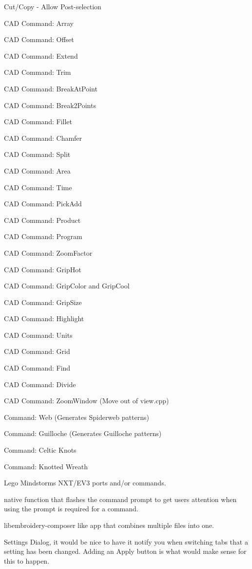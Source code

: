   \item Cut/Copy - Allow Post-selection
  \item CAD Command: Array
  \item CAD Command: Offset
  \item CAD Command: Extend
  \item CAD Command: Trim
  \item CAD Command: BreakAtPoint
  \item CAD Command: Break2Points
  \item CAD Command: Fillet
  \item CAD Command: Chamfer
  \item CAD Command: Split
  \item CAD Command: Area
  \item CAD Command: Time
  \item CAD Command: PickAdd
  \item CAD Command: Product
  \item CAD Command: Program
  \item CAD Command: ZoomFactor
  \item CAD Command: GripHot
  \item CAD Command: GripColor and GripCool
  \item CAD Command: GripSize
  \item CAD Command: Highlight
  \item CAD Command: Units
  \item CAD Command: Grid
  \item CAD Command: Find
  \item CAD Command: Divide
  \item CAD Command: ZoomWindow (Move out of view.cpp)
  \item Command: Web (Generates Spiderweb patterns)
  \item Command: Guilloche (Generates Guilloche patterns)
  \item Command: Celtic Knots
  \item Command: Knotted Wreath
  \item Lego Mindstorms NXT/EV3 ports and/or commands.
  \item native function that flashes the command prompt to get users attention when using the prompt is required for a command.
  \item libembroidery-composer like app that combines multiple files into one.
  \item Settings Dialog, it would be nice to have it notify you when switching tabs that a setting has been changed. Adding an Apply button is what would make sense for this to happen.
